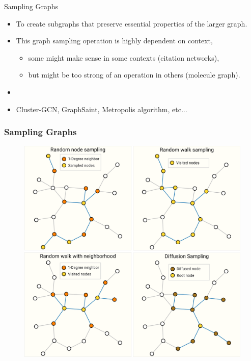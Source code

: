 \documentclass[
    11pt, %
    aspectratio=169, %
]{beamer}
\begin{document}
\begin{frame}{Sampling Graphs}
    \begin{itemize}
        \item To create subgraphs that preserve essential properties of the larger graph.
        \item This graph sampling operation is highly dependent on context,
        \begin{itemize}
            \item some might make sense in some contexts (citation networks),
            \item but might be too strong of an operation in others (molecule graph).
        \end{itemize}
        \item[]
        \item Cluster-GCN, GraphSaint, Metropolis algorithm, etc...
    \end{itemize}
\end{frame}

\begin{frame}
	\frametitle{Sampling Graphs}
	\begin{figure}
		\centering
		\includegraphics[width=.8\textwidth]{Images/samplings.png}
	\end{figure}
\end{frame}
\end{document}

